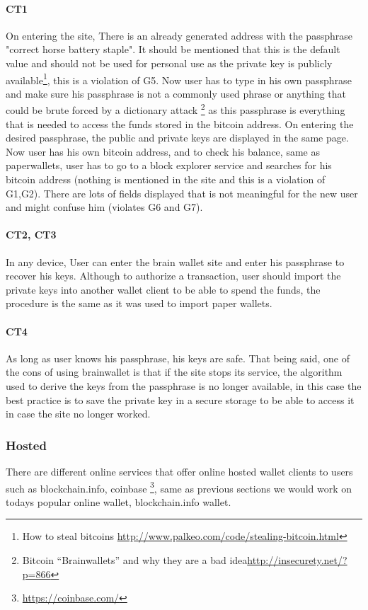 \paragraph{CT1} On entering the site, There is an already generated address with the passphrase "correct horse battery staple". It should be mentioned that this is the default value and should not be used for personal use as the private key is publicly available\footnote{How to steal bitcoins \url{http://www.palkeo.com/code/stealing-bitcoin.html}}, this is a violation of G5. Now user has to type in his own passphrase and make sure his passphrase is not a commonly used phrase or anything that could be brute forced by a dictionary attack \footnote{Bitcoin “Brainwallets” and why they are a bad idea\url{http://insecurety.net/?p=866}} as this passphrase is everything that is needed to access the funds stored in the bitcoin address. On entering the desired passphrase, the public and private keys are displayed in the same page. Now user has his own bitcoin address, and to check his balance, same as paperwallets, user has to go to a block explorer service and searches for his bitcoin address (nothing is mentioned in the site and this is a violation of G1,G2). There are lots of fields displayed that is not meaningful for the new user and might confuse him (violates G6 and G7).

\paragraph{CT2, CT3} In any device, User can enter the brain wallet site and enter his passphrase to recover his keys. Although to authorize a transaction, user should import the private keys into another wallet client to be able to spend the funds, the procedure is the same as it was used to import paper wallets.

\paragraph{CT4} As long as user knows his passphrase, his keys are safe. That being said, one of the cons of using brainwallet is that if the site stops its service, the algorithm used to derive the keys from the passphrase is no longer available, in this case the best practice is to save the private key in a secure storage to be able to access it in case the site no longer worked.


\subsubsection{Hosted}
\label{hosted}
There are different online services that offer online hosted wallet clients to users such as blockchain.info, coinbase \footnote{\url{https://coinbase.com/}}, same as previous sections we would work on todays popular online wallet, blockchain.info wallet.

